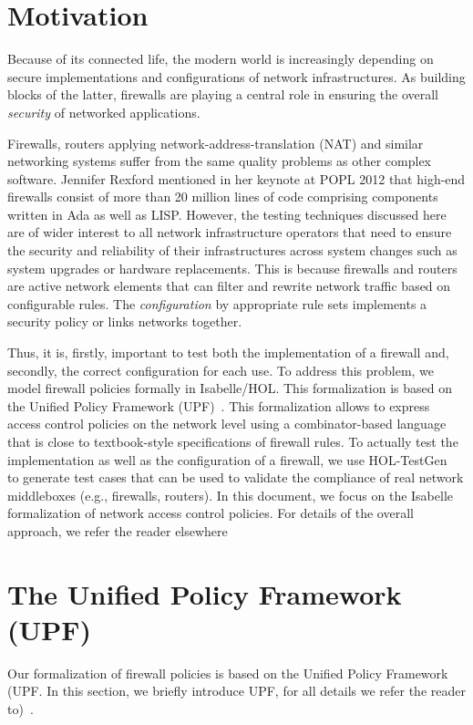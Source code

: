\section{Motivation}
Because of its connected life, the modern world is increasingly
depending on secure implementations and configurations of network
infrastructures. As building blocks of the latter, firewalls are
playing a central role in ensuring the overall \emph{security} of
networked applications.

Firewalls, routers applying network-address-translation (NAT) and
similar networking systems suffer from the same quality problems as
other complex software. Jennifer Rexford mentioned in her keynote at
POPL 2012 that high-end firewalls consist of more than 20
million lines of code comprising components written in Ada as well as
LISP. However, the testing techniques discussed here are of
wider interest to all network infrastructure operators that need to
ensure the security and reliability of their infrastructures across
system changes such as system upgrades or hardware replacements. This
is because firewalls and routers are active network elements that can
filter and rewrite network traffic based on configurable rules. The
\emph{configuration} by appropriate rule sets implements a security
policy or links networks together.

Thus, it is, firstly, important to test both the implementation of a
firewall and, secondly, the correct configuration for each use. To
address this problem, we model firewall policies formally in
Isabelle/HOL. This formalization is based on the Unified Policy
Framework (UPF)~\cite{brucker.ea:upf:2014}. This formalization allows
to express access control policies on the network level using a
combinator-based language that is close to textbook-style
specifications of firewall rules. To actually test the implementation
as well as the configuration of a firewall, we use
HOL-TestGen~\cite{brucker.ea:interactive:2005,brucker.ea:hol-testgen-fw:2013,brucker.ea:theorem-prover:2012}
to generate test cases that can be used to validate the compliance of
real network middleboxes (e.g., firewalls, routers). In this document,
we focus on the Isabelle formalization of network access control
policies. For details of the overall approach, we refer the reader
elsewhere~\cite{brucker.ea:formal-fw-testing:2014}

\section{The Unified Policy Framework (UPF)}
Our formalization of firewall policies is based on the Unified Policy
Framework (UPF. In this section, we briefly introduce UPF, for all
details we refer the reader to)~\cite{brucker.ea:upf:2014}.


